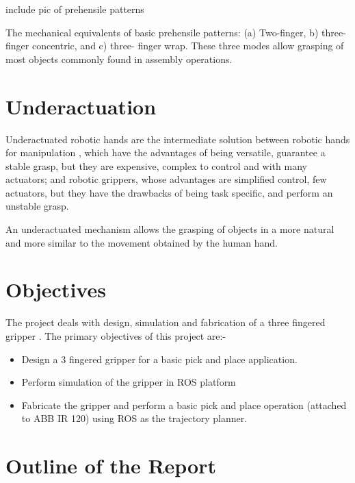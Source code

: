 \documentclass[a4paper,12pt,one side]{report}%
\begin{document}
\par include pic of prehensile patterns
\par The mechanical equivalents of basic prehensile patterns:
(a) Two-finger, b) three-finger concentric, and c) three-
finger wrap. These three modes allow grasping of most objects
commonly found in assembly operations.

		
\section{Underactuation}
\par Underactuated robotic hands are the intermediate solution between robotic hands for manipulation , which have the advantages of being versatile, guarantee a stable grasp, but they are expensive, complex to control and with many actuators; and robotic grippers, whose advantages are simplified control, few actuators, but they have the drawbacks of being task specific, and perform an unstable grasp. 

\par An underactuated mechanism allows the grasping of objects in a more natural and more similar to the movement obtained by the human hand. \cite{Martinoli2012SpringerPreface}


		
		
\section{Objectives}
\label{Objectives} 
The project deals with design, simulation and fabrication of a three fingered gripper . The primary objectives of this project are:-\
\begin{itemize}
\item Design a 3 fingered gripper for a basic pick and place application.
\item Perform simulation of the gripper in ROS platform
\item Fabricate the gripper and perform a basic pick and place operation (attached to ABB IR 120) using ROS as the trajectory planner.
\end{itemize}

\section{Outline of the Report}
\end{document}
